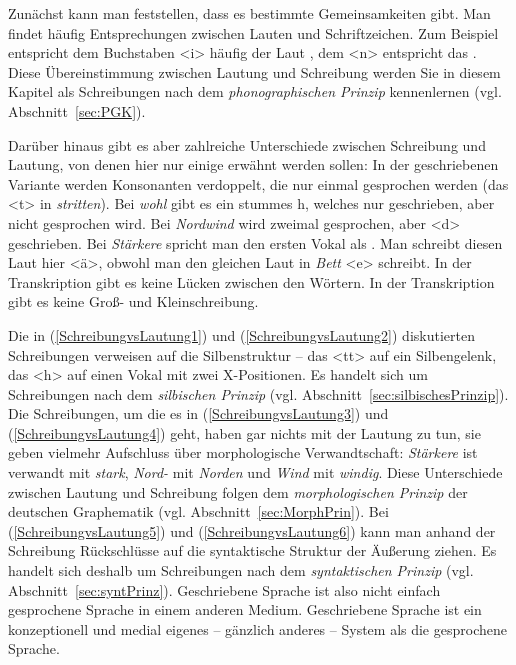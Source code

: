 Zunächst kann man feststellen, dass es bestimmte Gemeinsamkeiten gibt. Man findet häufig Entsprechungen zwischen Lauten und Schriftzeichen. Zum Beispiel entspricht dem Buchstaben <i> häufig der Laut \textipa{[I]}, dem <n> entspricht das \textipa{[n]}. Diese Übereinstimmung zwischen Lautung und Schreibung werden Sie in diesem Kapitel als Schreibungen nach dem \textit{phonographischen Prinzip} kennenlernen (vgl. Abschnitt~\ref{sec:PGK}).

Darüber hinaus gibt es aber zahlreiche Unterschiede zwischen Schreibung und Lautung, von denen hier nur einige erwähnt werden sollen:
\ea
\ea \label{SchreibungvsLautung1} In der geschriebenen Variante werden Konsonanten verdoppelt, die nur einmal gesprochen werden (\zB das <t> in \textit{stritten}).
\ex \label{SchreibungvsLautung2} Bei \textit{wohl} gibt es ein stummes h, welches nur geschrieben, aber nicht gesprochen wird.
\ex \label{SchreibungvsLautung3} Bei \textit{Nordwind} wird zweimal \textipa{[t]} gesprochen, aber <d> geschrieben.
\ex \label{SchreibungvsLautung4} Bei \textit{Stärkere} spricht man den ersten Vokal als \textipa{[E]}. Man schreibt diesen Laut hier <ä>, obwohl man den gleichen Laut in \textit{Bett} <e> schreibt.
\ex \label{SchreibungvsLautung5} In der Transkription gibt es keine Lücken zwischen den Wörtern. 
\ex \label{SchreibungvsLautung6} In der Transkription gibt es keine Groß- und Kleinschreibung.
\z
\z


Die in (\ref{SchreibungvsLautung1}) und (\ref{SchreibungvsLautung2}) diskutierten Schreibungen verweisen auf die Silbenstruktur -- das <tt> auf ein Silbengelenk, das <h> auf einen Vokal mit zwei X-Positionen. Es handelt sich um Schreibungen nach dem \textit{silbischen Prinzip} (vgl. Abschnitt~\ref{sec:silbischesPrinzip}). Die Schreibungen, um die es in (\ref{SchreibungvsLautung3}) und (\ref{SchreibungvsLautung4}) geht, haben gar nichts mit der Lautung zu tun, sie geben vielmehr Aufschluss über morphologische Verwandtschaft: \textit{Stärkere} ist verwandt mit \textit{stark}, \textit{Nord-} mit \textit{Norden} und \textit{Wind} mit \textit{windig}. Diese Unterschiede zwischen Lautung und Schreibung folgen dem \textit{morphologischen Prinzip} der deutschen Graphematik (vgl. Abschnitt~\ref{sec:MorphPrin}). Bei (\ref{SchreibungvsLautung5}) und (\ref{SchreibungvsLautung6}) kann man anhand der Schreibung Rückschlüsse auf die syntaktische Struktur der Äußerung ziehen. Es handelt sich deshalb um Schreibungen nach dem \textit{syntaktischen Prinzip} (vgl. Abschnitt~\ref{sec:syntPrinz}). Geschriebene Sprache ist also nicht einfach gesprochene Sprache in einem anderen Medium. Geschriebene Sprache ist ein konzeptionell und medial eigenes -- gänzlich anderes -- System als die gesprochene Sprache. 

